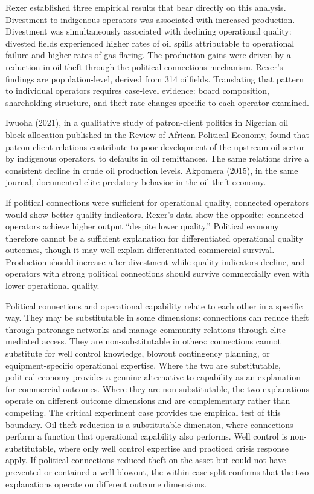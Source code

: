\documentclass[twoside,fontset=lmodern]{mitthesis}
\begin{document}
Rexer established three empirical results that bear directly on this
analysis. Divestment to indigenous operators was associated with
increased production. Divestment was simultaneously associated with
declining operational quality: divested fields experienced higher rates
of oil spills attributable to operational failure and higher rates of
gas flaring. The production gains were driven by a reduction in oil
theft through the political connections mechanism. Rexer's findings are
population-level, derived from 314 oilfields. Translating that pattern
to individual operators requires case-level evidence: board composition,
shareholding structure, and theft rate changes specific to each operator
examined.

Iwuoha (2021), in a qualitative study of patron-client politics in
Nigerian oil block allocation published in the Review of African
Political Economy, found that patron-client relations contribute to poor
development of the upstream oil sector by indigenous operators, to
defaults in oil remittances. The same relations drive a consistent
decline in crude oil production levels. Akpomera (2015), in the same
journal, documented elite predatory behavior in the oil theft economy.

If political connections were sufficient for operational quality,
connected operators would show better quality indicators. Rexer's data
show the opposite: connected operators achieve higher output ``despite
lower quality.'' Political economy therefore cannot be a sufficient
explanation for differentiated operational quality outcomes, though it
may well explain differentiated commercial survival. Production should
increase after divestment while quality indicators decline, and
operators with strong political connections should survive commercially
even with lower operational quality.

Political connections and operational capability relate to each other in
a specific way. They may be substitutable in some dimensions:
connections can reduce theft through patronage networks and manage
community relations through elite-mediated access. They are
non-substitutable in others: connections cannot substitute for well
control knowledge, blowout contingency planning, or equipment-specific
operational expertise. Where the two are substitutable, political
economy provides a genuine alternative to capability as an explanation
for commercial outcomes. Where they are non-substitutable, the two
explanations operate on different outcome dimensions and are
complementary rather than competing. The critical experiment case
provides the empirical test of this boundary. Oil theft reduction is a
substitutable dimension, where connections perform a function that
operational capability also performs. Well control is non-substitutable,
where only well control expertise and practiced crisis response apply.
If political connections reduced theft on the asset but could not have
prevented or contained a well blowout, the within-case split confirms
that the two explanations operate on different outcome dimensions.
\end{document}
